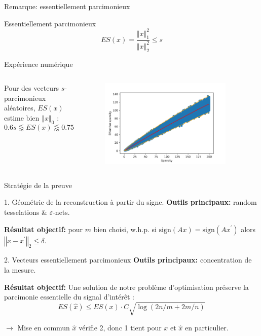 \documentclass[10pt, aspectratio=169]{beamer}
\newcommand{\norm}[1]{\left\Vert #1 \right\Vert}
\begin{document}
  \begin{frame}{Remarque: essentiellement parcimonieux}
  \begin{block}{Essentiellement parcimonieux}
\smallskip
  $$ ES(x) = \frac{\Vert x\Vert_1^2}{\Vert x\Vert_2^2} \leq s$$
  \end{block}
\begin{block}{Expérience numérique}
\smallskip
\begin{columns}
  \begin{column}{0.45\textwidth}
  Pour des vecteurs $s$-parcimonieux aléatoires, $ES(x)$ estime bien $\norm{x}_0$ :
  $$0.6 s \lessapprox ES(x) \lessapprox{0.75} s $$
  \end{column}
  \begin{column}{0.45\textwidth}
\begin{figure}
    \centering
    \includegraphics[width=0.90\textwidth]{figures/es.png}
\end{figure}    
  \end{column}
\end{columns}
     
    \end{block} 
  \end{frame}

\begin{frame}{Stratégie de la preuve}
\begin{block}{1. Géométrie de la reconstruction à partir du signe.}
\smallskip
        \textbf{Outils principaux:} random tesselations \& $\varepsilon$-nets.
        
        \textbf{Résultat objectif:} pour $m$ bien choisi, w.h.p. si $\mathrm{sign}(Ax)=\mathrm{sign}(Ax^\prime)$ alors $\norm{x-x^\prime}_2 \leq \delta$.
\end{block}
\begin{block}{2. Vecteurs essentiellement parcimonieux}
\smallskip
        \textbf{Outils principaux:} concentration de la mesure.
        
        \textbf{Résultat objectif:} Une solution de notre problème d'optimisation préserve la parcimonie essentielle du signal d'intérêt : $$ES(\hat{x}) \leq  ES(x) \cdot C \sqrt{\log(2n/m + 2m/n)}  $$
\end{block}

\begin{block}{$\rightarrow$ Mise en commun}
\smallskip
$\hat x$ vérifie 2, donc 1 tient pour $x$ et $\hat x$ en particulier.
\end{block}
\end{frame}
\end{document}
